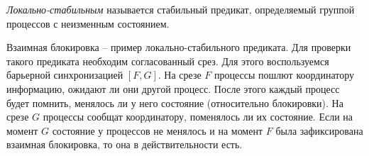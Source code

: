 \begin{definition}
    \textit{Локально-стабильным} называется стабильный предикат, определяемый
    группой процессов с неизменным состоянием.
\end{definition}

\begin{example}
    Взаимная блокировка -- пример локально-стабильного предиката. Для проверки
    такого предиката необходим согласованный срез. Для этого воспользуемся барьерной
    синхронизацией $[F, G]$. На срезе $F$ процессы пошлют координатору информацию,
    ожидают ли они другой процесс. После этого каждый процесс будет помнить,
    менялось ли у него состояние (относительно блокировки).
    На срезе $G$ процессы сообщат координатору, поменялось ли их состояние.
    Если на момент $G$ состояние у процессов не менялось и на момент $F$ была
    зафиксирована взаимная блокировка, то она в действительности есть.
\end{example}

